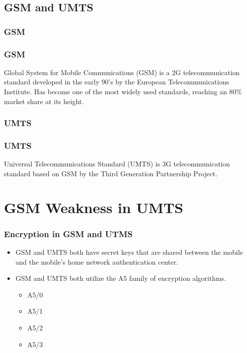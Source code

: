 \documentclass{beamer}
\begin{document}
\subsection{GSM and UMTS}
	\subsubsection{GSM}
		\begin{frame}
		\frametitle{GSM}
		Global System for Mobile Communications (GSM) is a 2G telecommunication standard developed in the early 90's by the European Telecommunications Institute. Has become one of the most widely used standards, reaching an 80\% market share at its height.
					
		\end{frame}
	\subsubsection{UMTS}
	\begin{frame}
		\frametitle{UMTS}
		Universal Telecommunications Standard (UMTS) is 3G telecommunication standard based on GSM by the Third Generation Partnership Project.   
	\end{frame}

	
\section{GSM Weakness in UMTS}

	

	\begin{frame}
	\frametitle{Encryption in GSM and UTMS}
	\begin{itemize}
	
	
		\item GSM and UMTS both have secret keys that are shared between the mobile and the mobile's home network authentication center.
		
		\item GSM and UMTS both utilize the A5 family of encryption algorithms. 
		 \begin{itemize}
			\item A5/0 
			\item A5/1
			\item A5/2
			\item A5/3 
		\end{itemize}
		\end{itemize}
		
	\end{frame}
	
\end{document}
